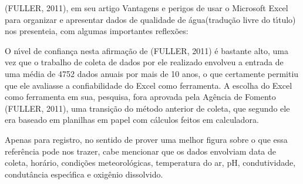 \documentclass[
12pt,		%
openright,	%
twoside,  %
a4paper,			%
chapter=TITLE,		%
english,			%
french,				%
spanish,			%
brazil				%
]{USPSC-classe/USPSC}
\begin{document}
(FULLER, 2011), em seu artigo \textquotedbl Vantagens e perigos de usar o Microsoft Excel para organizar e apresentar dados de qualidade de \'agua\textquotedbl  (tradu\c{c}\~ao livre do t\'{\i}tulo) nos presenteia, com algumas importantes reflex\~oes:


















\noindent\begin{center}\mbox{\centering{}}\end{center}


O n\'{\i}vel de confian\c{c}a nesta afirma\c{c}\~ao de (FULLER, 2011) \'e bastante alto, uma vez que o trabalho de coleta de dados por ele realizado envolveu a entrada de uma m\'edia de 4752 dados anuais por mais de 10 anos, o que certamente permitiu que ele avaliasse a confiabilidade do Excel como ferramenta. A escolha do Excel como ferramenta em sua, pesquisa, fora aprovada pela Ag\^encia de Fomento  (FULLER, 2011), uma transi\c{c}\~ao do m\'etodo anterior de coleta, que segundo ele era baseado em planilhas em papel com c\'alculos feitos em calculadora.

















Apenas para registro, no sentido de prover uma melhor figura sobre o que essa refer\^encia pode nos trazer, cabe mencionar que os dados envolviam data de coleta, hor\'ario, condi\c{c}\~oes meteorol\'ogicas, temperatura do ar, pH, condutividade, condut\^ancia espec\'{\i}fica e oxig\^enio dissolvido.
\end{document}
